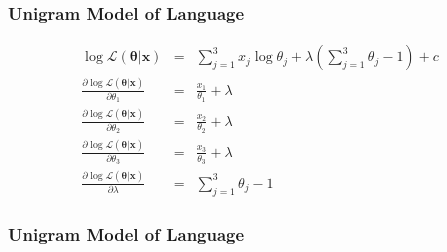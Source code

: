 \documentclass{beamer}
\numberwithin{equation}{section}
\begin{document}
\begin{frame}
\frametitle{Unigram Model of Language}

\begin{eqnarray}
\log \mathcal{L}(\boldsymbol{\theta}| \boldsymbol{x} ) & =  & \sum_{j=1}^{3} x_{j} \log \theta_{j} + \lambda(\sum_{j=1}^{3} \theta_{j} - 1)   + c \nonumber \\
\frac{\partial \log \mathcal{L}(\boldsymbol{\theta}| \boldsymbol{x} )}{\partial \theta_{1}} & = & \frac{x_{1}}{\theta_{1}} + \lambda \nonumber \\
\frac{\partial \log \mathcal{L}(\boldsymbol{\theta}| \boldsymbol{x} )}{\partial \theta_{2}} & = & \frac{x_{2}}{\theta_{2}} + \lambda \nonumber \\
\frac{\partial \log \mathcal{L}(\boldsymbol{\theta}| \boldsymbol{x} )}{\partial \theta_{3}} & = & \frac{x_{3}}{\theta_{3}} + \lambda \nonumber \\
\frac{\partial \log \mathcal{L}(\boldsymbol{\theta}| \boldsymbol{x} )}{\partial \lambda} & = & \sum_{j=1}^{3}\theta_{j} - 1 \nonumber 
\end{eqnarray}
\end{frame}


\begin{frame}
\frametitle{Unigram Model of Language}

\Large 


\pause \pause 

\end{frame}
\end{document}
